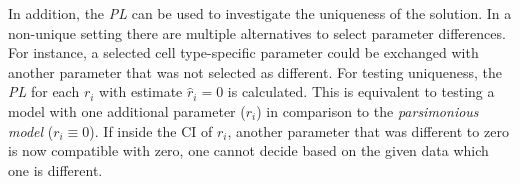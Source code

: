 \documentclass{bioinfo}
\begin{document}
In addition, the \emph{PL} can be used to investigate the uniqueness of the solution.
In a non-unique setting there are multiple alternatives to select parameter differences.
For instance, a selected cell type-specific parameter could be exchanged with another parameter that was not selected as different.
For testing uniqueness, the \emph{PL} for each $r_i$ with estimate $\hat r_i=0$ is calculated.
This is equivalent to testing a model with one additional parameter ($r_i$) in comparison to the \emph{parsimonious model} ($r_i \equiv 0$).
If inside the CI of $r_i$, another parameter that was different to zero is now compatible with zero, one cannot decide based on the given data which one is different.

\end{document}
